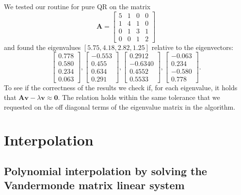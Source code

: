 \documentclass[a4paper,11]{article}
\newcommand{\bA}{\mathbf{A}}
\newcommand{\bv}{\mathbf{v}}
\begin{document}
We tested our routine for pure QR on the matrix
\[
	\bA=\begin{bmatrix}
		 5 & 1 & 0 & 0\\
		 1 & 4 & 1 & 0\\
		 0 & 1 & 3 & 1\\
		 0 & 0 & 1 & 2
	\end{bmatrix}
\]
and found the eigenvalues $[5.75,  4.18,  2.82, 1.25]$ relative to the 
eigenvectors:
\[
	\begin{bmatrix}
		 0.778 \\
		 0.580 \\
		 0.234 \\
		 0.063 
	\end{bmatrix},
	\begin{bmatrix}
		-0.553 \\
		 0.455 \\
		 0.634 \\
		 0.291 
	\end{bmatrix},
	\begin{bmatrix}
		 0.2912 \\
		-0.6340 \\
		 0.4552 \\
		 0.5533
	\end{bmatrix},
	\begin{bmatrix}
		-0.063 \\
		 0.234 \\
		-0.580 \\
		 0.778
	\end{bmatrix}.
\]
To see if the correctness of the results we check if, for each eigenvalue, it 
holds that $\bA \bv - \lambda \bv \approx \mathbf 0$. 
The relation holds within the same tolerance that we requested on the off diagonal
terms of the eigenvalue matrix in the algorithm.


\section{Interpolation}

\subsection{Polynomial interpolation by solving the Vandermonde matrix linear system}
\end{document}
